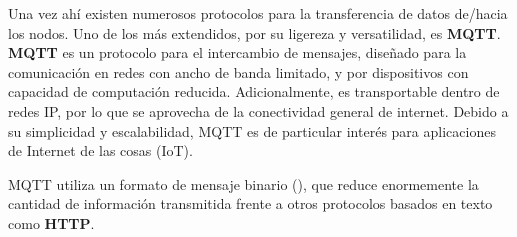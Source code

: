 \documentclass[../main.tex]{subfiles}
\begin{document}
            Una vez ahí existen numerosos protocolos para la transferencia de datos de/hacia los nodos. Uno de los más extendidos, por su ligereza y versatilidad, es \textbf{MQTT}. \textbf{MQTT} es un protocolo para el intercambio de mensajes, diseñado para la comunicación en redes con ancho de banda limitado, y por dispositivos con capacidad de computación reducida. Adicionalmente, es transportable dentro de redes IP, por lo que se aprovecha de la conectividad general de internet. Debido a su simplicidad y escalabilidad, MQTT es de particular interés para aplicaciones de Internet de las cosas (IoT).

            MQTT utiliza un formato de mensaje binario (), que reduce enormemente la cantidad de información transmitida frente a otros protocolos basados en texto como \textbf{HTTP}.
\end{document}
